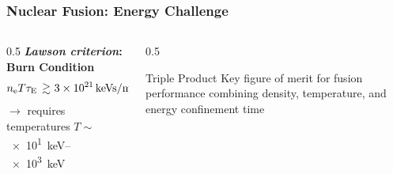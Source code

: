 \begin{frame}
    \addtocounter{framenumber}{-1}

    \frametitle{Nuclear Fusion: Energy Challenge}
    \backgroundlogo%

    \begin{columns}
        \begin{column}{0.5\textwidth}
            \textbf{\textit{Lawson criterion}: Burn Condition}
            \begin{align*}
                n_{\mathrm{e}}T\tau_{\mathrm{E}}\,\gtrsim&\,\,3\times10^{21}\,\text{keVs/m}^{3}
            \end{align*}
            $\rightarrow$ requires temperatures $T\sim$\,\SIrange{e1}{e3}{\kilo\electronvolt}
        \end{column}

        \begin{column}{0.5\textwidth}
            \begin{block}{Triple Product}
                Key figure of merit for fusion performance combining density, temperature, and energy confinement time
            \end{block}
        \end{column}
    \end{columns}

\end{frame}

